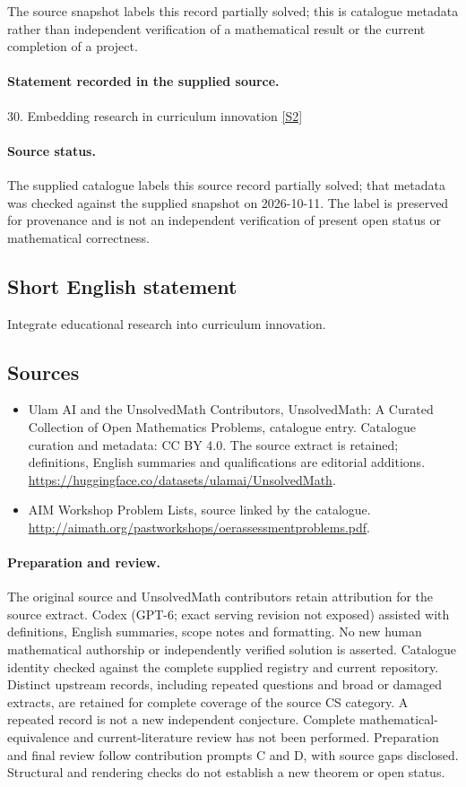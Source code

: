 \documentclass[11pt]{article}
\begin{document}
The source snapshot labels this record partially solved; this is catalogue metadata rather than independent verification of a mathematical result or the current completion of a project.
\paragraph{Statement recorded in the supplied source.}
30. Embedding research in curriculum innovation \href{http://aimath.org/pastworkshops/oerassessmentproblems.pdf}{[S2]}
\paragraph{Source status.}
The supplied catalogue labels this source record partially solved; that metadata was checked against the supplied snapshot on 2026-10-11. The label is preserved for provenance and is not an independent verification of present open status or mathematical correctness.
\subsection{Short English statement}
Integrate educational research into curriculum innovation.
\subsection{Sources}
\begin{itemize}
\item[S1] Ulam AI and the UnsolvedMath Contributors, UnsolvedMath: A Curated Collection of Open Mathematics Problems, catalogue entry. Catalogue curation and metadata: CC BY 4.0. The source extract is retained; definitions, English summaries and qualifications are editorial additions.
\url{https://huggingface.co/datasets/ulamai/UnsolvedMath}.
\item[S2] AIM Workshop Problem Lists, source linked by the catalogue.
\url{http://aimath.org/pastworkshops/oerassessmentproblems.pdf}.
\end{itemize}
\paragraph{Preparation and review.}
The original source and UnsolvedMath contributors retain attribution for the source extract. Codex (GPT-6; exact serving revision not exposed) assisted with definitions, English summaries, scope notes and formatting. No new human mathematical authorship or independently verified solution is asserted. Catalogue identity checked against the complete supplied registry and current repository. Distinct upstream records, including repeated questions and broad or damaged extracts, are retained for complete coverage of the source CS category. A repeated record is not a new independent conjecture. Complete mathematical-equivalence and current-literature review has not been performed. Preparation and final review follow contribution prompts C and D, with source gaps disclosed. Structural and rendering checks do not establish a new theorem or open status.
\label{end:statement}
\end{document}
